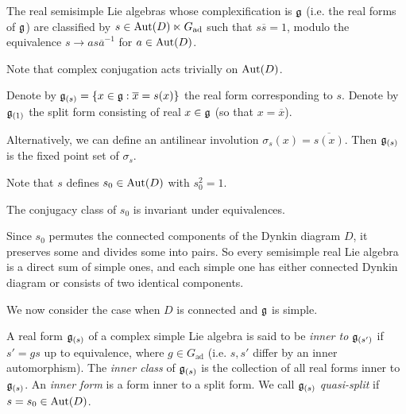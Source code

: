\begin{theorem}
  The real semisimple Lie algebras
  whose complexification is $\mathfrak{g}$ (i.e.
  the real forms of $\mathfrak{g}$) are classified
  by $s \in \operatorname{Aut}(D) \ltimes G_{\mathrm{ad}}$
  such that $s \overline{s} = 1$,
  modulo the equivalence
  $s \to a s \overline{a}^{-1}$ for $a \in \operatorname{Aut}(D)$.
\end{theorem}

\begin{remark}
  Note that complex conjugation
  acts trivially on $\operatorname{Aut}(D)$.
\end{remark}

\begin{remark}
  Denote by $\mathfrak{g}_{(s)} = \{x \in \mathfrak{g} : \overline{x} = s(x)\}$ the
  real form corresponding to $s$.
  Denote by $\mathfrak{g}_{(1)}$ the split
  form consisting of real $x \in \mathfrak{g}$
  (so that $x = \overline{x}$).

  Alternatively, we can define an
  antilinear involution
  $\sigma_s(x) = \overline{s(x)}$.
  Then $\mathfrak{g}_{(s)}$ is the fixed point
  set of $\sigma_s$.
\end{remark}

\begin{remark}
  Note that $s$ defines $s_0 \in \operatorname{Aut}(D)$
  with $s_0^2 = 1$.
\end{remark}

\begin{corollary}
  The conjugacy class of $s_0$ is
  invariant under equivalences.
\end{corollary}

\begin{remark}
  Since $s_0$ permutes the
  connected components of the Dynkin
  diagram $D$, it preserves some and
  divides some into pairs.
  So every semisimple real
  Lie algebra is a direct sum of simple
  ones, and each simple one has
  either connected Dynkin diagram or
  consists of two identical components.
\end{remark}

\begin{remark}
  We now consider the case when
  $D$ is connected and $\mathfrak{g}$ is simple.
\end{remark}

\begin{definition}
  A real form $\mathfrak{g}_{(s)}$ of a complex
  simple Lie algebra is said to be
  \emph{inner to}  $\mathfrak{g}_{(s')}$ 
  if $s' = gs$ up to equivalence, where
  $g \in G_{\mathrm{ad}}$ (i.e. $s, s'$ differ
  by an inner automorphism).
  The \emph{inner class} of $\mathfrak{g}_{(s)}$ is the collection
  of all real forms inner to
  $\mathfrak{g}_{(s)}$. An \emph{inner form}
  is a form inner to a split form.
  We call $\mathfrak{g}_{(s)}$ \emph{quasi-split}
  if $s = s_0 \in \operatorname{Aut}(D)$.
\end{definition}


